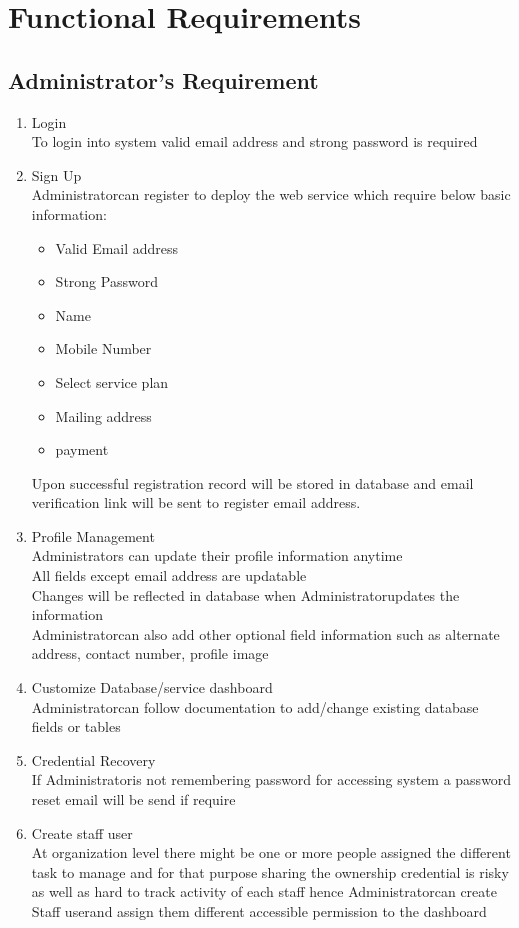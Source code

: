 \documentclass{scrreprt}
\newcommand*\arrow{\item[$\Rightarrow$]}
\def\admin{Administrator}
\def\staff{Staff user}
\begin{document}
\section{Functional Requirements}
\label{functions}
\subsection{\admin's Requirement}
\begin{enumerate}[start=1,label={\bfseries REQ \arabic*:}]
	\addtolength{\itemindent}{40pt}
	\item Login
		\\To login into system valid email address and strong password is required
	\item Sign Up
		\\ \admin\space can register to deploy the web service which require below basic information:
		\begin{itemize}
			\arrow Valid Email address
			\arrow Strong Password
			\arrow Name
			\arrow Mobile Number
			\arrow Select service plan
			\arrow Mailing address
			\arrow payment
		\end{itemize}
		Upon successful registration record will be stored in database and email verification link will be sent to register email address.
	\item Profile Management
		\\ \admin s can update their profile information anytime
		\\All fields except email address are updatable
		\\Changes will be reflected in database when \admin \space updates the information
		\\ \admin can also add other optional field information such as alternate address, contact number, profile image
	\item Customize Database/service dashboard
		\\ \admin \space can follow documentation to add/change existing database fields or tables
	\item Credential Recovery
		\\If \admin \space is not remembering password for accessing system a password reset email will be send if require 
	\item Create staff user
		\\At organization level there might be one or more people assigned the different task to manage and for that purpose sharing the ownership credential is risky as well as hard to track activity of each staff hence \admin \space can create \staff \space and assign them different accessible permission to the dashboard

\end{enumerate}
\end{document}

